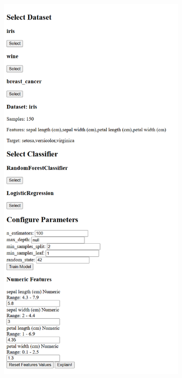 \begin{figure}[htbp]
    \centering
    \begin{subfigure}[c]{0.49\textwidth}
        \centering
        \includegraphics[width=\textwidth]{images/first webapp a.png}

\end{subfigure}
\end{figure}
